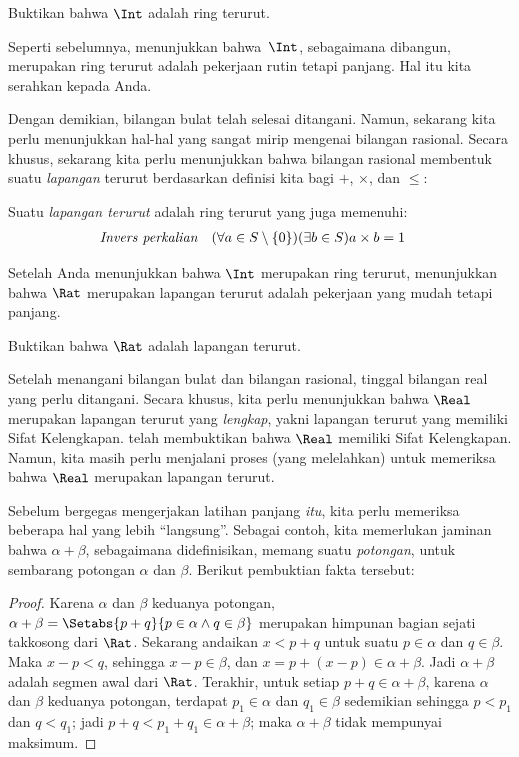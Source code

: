 \documentclass[../../../include/open-logic-section]{subfiles}
\begin{document}
\begin{prob}
Buktikan bahwa $\Int$ adalah ring terurut.
\end{prob}

Seperti sebelumnya, menunjukkan bahwa~$\Int$, sebagaimana dibangun, merupakan
ring terurut adalah pekerjaan rutin tetapi panjang. Hal itu kita serahkan
kepada Anda.

Dengan demikian, bilangan bulat telah selesai ditangani. Namun, sekarang kita
perlu menunjukkan hal-hal yang sangat mirip mengenai bilangan rasional. Secara
khusus, sekarang kita perlu menunjukkan bahwa bilangan rasional membentuk
suatu \emph{lapangan} terurut berdasarkan definisi kita bagi $+$, $\times$,
dan $\leq$:
\begin{defn}
Suatu \emph{lapangan terurut} adalah ring terurut yang juga memenuhi:
\begin{align*}
	\emph{Invers perkalian}& & (\forall a \in S \setminus \{0\})(\exists b \in S) a\times b& = 1
\end{align*}
\end{defn}

Setelah Anda menunjukkan bahwa $\Int$ merupakan ring terurut, menunjukkan
bahwa $\Rat$ merupakan lapangan terurut adalah pekerjaan yang mudah tetapi
panjang.

\begin{prob}
Buktikan bahwa $\Rat$ adalah lapangan terurut.
\end{prob}

Setelah menangani bilangan bulat dan bilangan rasional, tinggal bilangan real
yang perlu ditangani. Secara khusus, kita perlu menunjukkan bahwa $\Real$
merupakan lapangan terurut yang \emph{lengkap}, yakni lapangan terurut yang
memiliki Sifat Kelengkapan.  telah membuktikan
bahwa $\Real$ memiliki Sifat Kelengkapan. Namun, kita masih perlu menjalani
proses (yang melelahkan) untuk memeriksa bahwa $\Real$ merupakan lapangan
terurut.

Sebelum bergegas mengerjakan latihan panjang \emph{itu}, kita perlu memeriksa
beberapa hal yang lebih ``langsung''. Sebagai contoh, kita memerlukan jaminan
bahwa $\alpha + \beta$, sebagaimana didefinisikan, memang suatu
\emph{potongan}, untuk sembarang potongan $\alpha$ dan $\beta$. Berikut
pembuktian fakta tersebut:

\begin{proof}	
Karena $\alpha$ dan $\beta$ keduanya potongan, $\alpha + \beta = \Setabs{p
+ q}{p \in \alpha \land q \in \beta}$ merupakan himpunan bagian sejati
takkosong dari $\Rat$. Sekarang andaikan $x < p + q$ untuk suatu $p \in
\alpha$ dan $q \in \beta$. Maka $x - p < q$, sehingga $x - p \in \beta$,
dan $x = p + (x - p) \in \alpha + \beta$. Jadi $\alpha + \beta$ adalah
segmen awal dari $\Rat$. Terakhir, untuk setiap $p + q \in \alpha + \beta$,
karena $\alpha$ dan $\beta$ keduanya potongan, terdapat $p_1 \in \alpha$
dan $q_1 \in \beta$ sedemikian sehingga $p < p_1$ dan $q < q_1$; jadi $p +
q < p_1 + q_1 \in \alpha + \beta$; maka $\alpha + \beta$ tidak mempunyai
maksimum.
\end{proof}
\end{document}
